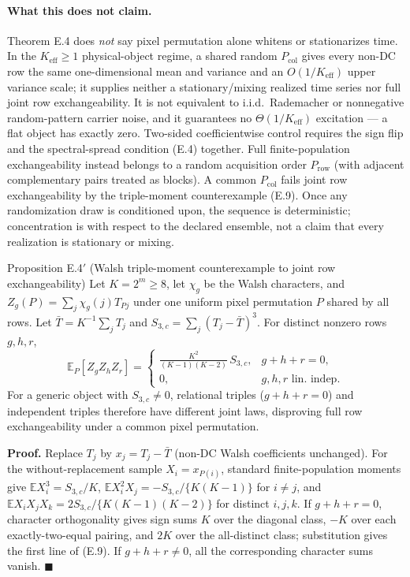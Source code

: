 \paragraph{What this does not claim.} Theorem E.4 does \emph{not} say pixel permutation alone whitens or stationarizes time. In the $K_{\mathrm{eff}}\ge1$ physical-object regime, a shared random $P_{\mathrm{col}}$ gives every non-DC row the same one-dimensional mean and variance and an $O(1/K_{\mathrm{eff}})$ upper variance scale; it supplies neither a stationary/mixing realized time series nor full joint row exchangeability. It is not equivalent to i.i.d.\ Rademacher or nonnegative random-pattern carrier noise, and it guarantees no $\Theta(1/K_{\mathrm{eff}})$ excitation --- a flat object has exactly zero. Two-sided coefficientwise control requires the sign flip and the spectral-spread condition (E.4) together. Full finite-population exchangeability instead belongs to a random acquisition order $P_{\mathrm{row}}$ (with adjacent complementary pairs treated as blocks). A common $P_{\mathrm{col}}$ fails joint row exchangeability by the triple-moment counterexample (E.9). Once any randomization draw is conditioned upon, the sequence is deterministic; concentration is with respect to the declared ensemble, not a claim that every realization is stationary or mixing.

\begin{namedthm}{Proposition E.4$'$ (Walsh triple-moment counterexample to joint row exchangeability)}
Let $K=2^m\ge8$, let $\chi_g$ be the Walsh characters, and $Z_g(P)=\sum_{j}\chi_g(j)T_{Pj}$ under one uniform pixel permutation $P$ shared by all rows. Let $\bar T=K^{-1}\sum_jT_j$ and $S_{3,c}=\sum_j(T_j-\bar T)^3$. For distinct nonzero rows $g,h,r$,
\begin{equation}
\mathbb E_P[Z_gZ_hZ_r]=
\begin{cases}
\frac{K^2}{(K-1)(K-2)}\,S_{3,c}, & g+h+r=0,\\[4pt]
0, & \text{$g,h,r$ lin.\ indep.}
\end{cases}
\tag{E.9}
\end{equation}
For a generic object with $S_{3,c}\neq0$, relational triples ($g+h+r=0$) and independent triples therefore have different joint laws, disproving full row exchangeability under a common pixel permutation.
\end{namedthm}

\noindent\textbf{Proof.} Replace $T_j$ by $x_j=T_j-\bar T$ (non-DC Walsh coefficients unchanged). For the without-replacement sample $X_i=x_{P(i)}$, standard finite-population moments give $\mathbb EX_i^3=S_{3,c}/K$, $\mathbb EX_i^2X_j=-S_{3,c}/\{K(K-1)\}$ for $i\ne j$, and $\mathbb EX_iX_jX_k=2S_{3,c}/\{K(K-1)(K-2)\}$ for distinct $i,j,k$. If $g+h+r=0$, character orthogonality gives sign sums $K$ over the diagonal class, $-K$ over each exactly-two-equal pairing, and $2K$ over the all-distinct class; substitution gives the first line of (E.9). If $g+h+r\neq0$, all the corresponding character sums vanish. \hfill$\blacksquare$

